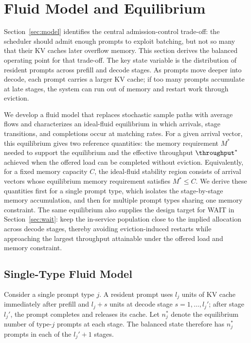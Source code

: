 \section{Fluid Model and Equilibrium}\label{sec:fluid}
Section~\ref{sec:model} identifies the central admission-control trade-off: the scheduler should admit enough prompts to exploit batching, but not so many that their KV caches later overflow memory. This section derives the balanced operating point for that trade-off. The key state variable is the distribution of resident prompts across prefill and decode stages. As prompts move deeper into decode, each prompt carries a larger KV cache; if too many prompts accumulate at late stages, the system can run out of memory and restart work through eviction.

We develop a fluid model that replaces stochastic sample paths with average flows and characterizes an ideal-fluid equilibrium in which arrivals, stage transitions, and completions occur at matching rates. For a given arrival vector, this equilibrium gives two reference quantities: the memory requirement \(M^*\) needed to support the equilibrium and the effective throughput \(\throughput^*\) achieved when the offered load can be completed without eviction. Equivalently, for a fixed memory capacity \(C\), the ideal-fluid stability region consists of arrival vectors whose equilibrium memory requirement satisfies \(M^*\le C\). We derive these quantities first for a single prompt type, which isolates the stage-by-stage memory accumulation, and then for multiple prompt types sharing one memory constraint. The same equilibrium also supplies the design target for WAIT in Section~\ref{sec:wait}: keep the in-service population close to the implied allocation across decode stages, thereby avoiding eviction-induced restarts while approaching the largest throughput attainable under the offered load and memory constraint.

\subsection{Single-Type Fluid Model}
Consider a single prompt type \(j\). A resident prompt uses \(l_j\) units of KV cache immediately after prefill and \(l_j+s\) units at decode stage \(s=1,\dots,l_j'\); after stage \(l_j'\), the prompt completes and releases its cache. Let \(n_j^*\) denote the equilibrium number of type-\(j\) prompts at each stage. The balanced state therefore has \(n_j^*\) prompts in each of the \(l_j'+1\) stages.

